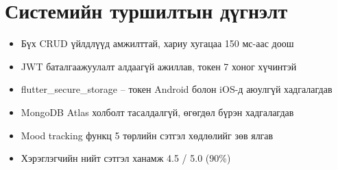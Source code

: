 \section{Системийн туршилтын дүгнэлт}

\begin{itemize}
  \item  Бүх CRUD үйлдлүүд амжилттай, хариу хугацаа 150 мс-аас доош
  \item  JWT баталгаажуулалт алдаагүй ажиллав, токен 7 хоног хүчинтэй
  \item  flutter\_secure\_storage -- токен Android болон iOS-д аюулгүй хадгалагдав
  \item  MongoDB Atlas холболт тасалдалгүй, өгөгдөл бүрэн хадгалагдав
  \item  Mood tracking функц 5 төрлийн сэтгэл хөдлөлийг зөв ялгав
  \item  Хэрэглэгчийн нийт сэтгэл ханамж 4.5 / 5.0 (90\%)
\end{itemize}
